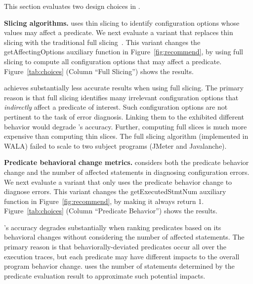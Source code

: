 This section evaluates two design choices in \ourtool.

\noindent \textbf{{Slicing algorithms.}} \ourtool
uses thin slicing to identify configuration options
whose values may affect a predicate. We next evaluate
a variant that replaces thin slicing with
the traditional full slicing~\cite{Horwitz:1988}.
This variant changes the getAffectingOptions
auxiliary function in Figure~\ref{fig:recommend}, by using full slicing to compute all
configuration options that may affect a predicate.
Figure~\ref{tab:choices} (Column ``Full Slicing'') shows the results.


\ourtool achieves substantially less accurate results when
using full slicing. The primary reason is that full slicing
identifies many irrelevant configuration options that \textit{indirectly}
affect a predicate of interest. Such configuration options
are not pertinent to the task of error diagnosis. Linking them
to the exhibited different behavior would degrade
\ourtool's accuracy. Further, computing full slices is much
more expensive than computing thin slices. 
The full slicing algorithm (implemented in WALA) failed to scale
to two subject programs (JMeter and Javalanche).

\vspace{1mm}

\noindent \textbf{Predicate behavioral change metrics.}
\ourtool considers both the predicate behavior change
and the number of affected statements in diagnosing
configuration errors. We next evaluate a variant
that only uses the predicate behavior change to diagnose errors.
This variant 
changes the getExecutedStmtNum auxiliary function in
Figure~\ref{fig:recommend}, by making it always return 1.
Figure~\ref{tab:choices} (Column ``Predicate Behavior'') shows
the results. 



\ourtool's accuracy degrades substantially when ranking
predicates based on its behavioral changes without considering
the number of affected statements.
The primary reason is that behaviorally-deviated predicates occur all over the execution traces,
but each predicate
may have different impacts to the overall program behavior change.
\ourtool uses the number of statements determined by the predicate
evaluation result to approximate such potential impacts.


